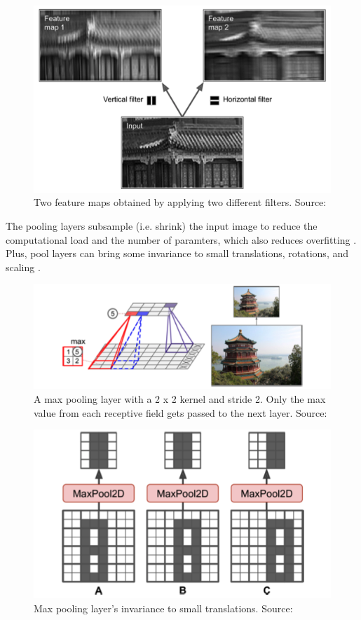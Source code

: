 \documentclass[a4paper,11pt,oneside]{article}
\begin{document}
  \begin{figure}[ht]
    \begin{center}
      \includegraphics[width=.8\textwidth]{filters.png}
    \end{center}
    \caption{Two feature maps obtained by applying two different filters. Source: \cite{geron2019hands}}
  \end{figure}

  The pooling layers subsample (i.e. shrink) the input image to reduce the computational load and the number of paramters,
  which also reduces overfitting \cite{geron2019hands}. Plus, pool layers can bring some invariance to small translations,
  rotations, and scaling \cite{geron2019hands}.

  \begin{figure}[ht]
    \begin{center}
      \includegraphics[width=.8\textwidth]{max_pooling.png}
    \end{center}
    \caption{A max pooling layer with a 2 x 2 kernel and stride 2. Only the max value from each receptive field
    gets passed to the next layer. Source: \cite{geron2019hands}}
  \end{figure}

  \begin{figure}[ht]
    \begin{center}
      \includegraphics[width=.8\textwidth]{max_pooling_invariance.png}
    \end{center}
    \caption{Max pooling layer's invariance to small translations. Source: \cite{geron2019hands}}
  \end{figure}
\end{document}
